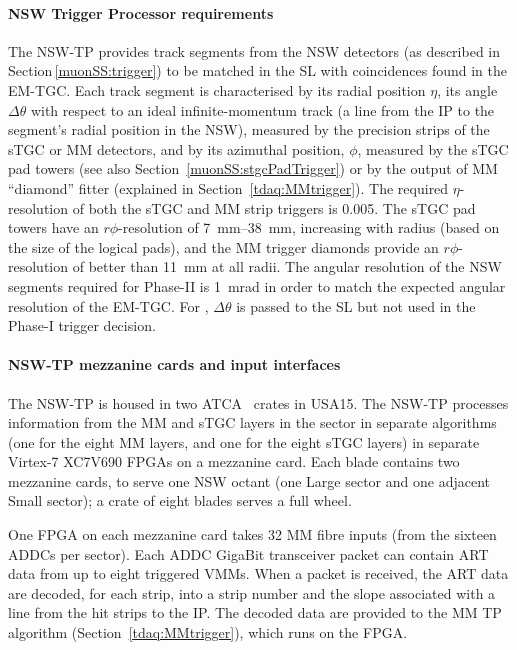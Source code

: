 \documentclass[cernpreprint, atlasdraft=false, UKenglish,british,orcidlogo, texmf, orcidlogo]{atlasdoc}
\begin{document}
\paragraph{NSW Trigger Processor requirements}
The \gls{NSW-TP} provides track segments from the \gls{NSW} detectors (as described in Section\,\ref{muonSS:trigger}) to be matched in the \gls{SL} with coincidences found in the \gls{EM-TGC}.
Each track segment is characterised by its radial position $\eta$, its angle $\Delta\theta$ with respect to an ideal infinite-momentum track (a line from the \gls{IP} to the segment's radial position in the \gls{NSW}), measured by the precision strips of the \gls{sTGC} or \gls{MM} detectors, and by its azimuthal position, $\phi$, measured by the \gls{sTGC} pad towers (see also Section~\ref{muonSS:stgcPadTrigger}) or by the output of \gls{MM} ``diamond'' fitter (explained in Section~\ref{tdaq:MMtrigger}).
The required $\eta$-resolution of both the \gls{sTGC} and \gls{MM} strip triggers is \num{0.005}.
The \gls{sTGC} pad towers have an $r\phi$-resolution of \SIrange{7}{38}{\mm}, increasing with radius (based on the size of the logical pads), and the \gls{MM} trigger diamonds provide an $r\phi$-resolution of better than \SI{11}{\mm} at all radii.
The angular resolution of the \gls{NSW} segments required for Phase-II is \SI{1}{\milli\radian} in order to match the expected angular resolution of the \gls{EM-TGC}. 
For \RunThr,
$\Delta\theta$ is passed to the \gls{SL} but not used in the Phase-I trigger decision.
 
\paragraph{NSW-TP mezzanine cards and input interfaces}
The \gls{NSW-TP} is housed in two \gls{ATCA}~\cite{bib:ATCA-RCE} 
crates in \gls{USA15}.
The \gls{NSW-TP} processes information from the \gls{MM} and \gls{sTGC} layers in the sector in separate algorithms (one for the eight \gls{MM} layers, and one for the eight \gls{sTGC} layers) in separate Virtex-7 XC7V690 \glspl{FPGA} 
on a mezzanine card.
Each blade contains two mezzanine cards, to serve one \gls{NSW} octant (one Large sector and one adjacent Small sector); a crate of eight blades serves a full wheel.
 
One \gls{FPGA} on each mezzanine card takes \num{32} \gls{MM} fibre inputs (from the sixteen \glspl{ADDC} per sector).
Each \gls{ADDC} GigaBit transceiver packet can contain \gls{ART} data from up to eight triggered \glspl{VMM}.
When a packet is received, the \gls{ART} data are decoded, for each strip, into a strip number and the slope associated with a line from the hit strips to the \gls{IP}.
The decoded data are provided to the \gls{MM} \gls{TP} algorithm (Section~\ref{tdaq:MMtrigger}), which runs on the \gls{FPGA}.
 
\end{document}
